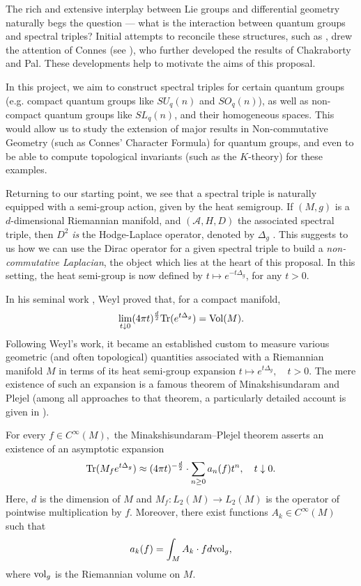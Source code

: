 \documentclass[12pt]{article}
\begin{document}
The rich and extensive interplay between Lie groups and differential geometry
naturally begs the question --- what is the interaction between quantum groups
and spectral triples?
Initial attempts to reconcile these structures, such as
\cite{ChakrabortyPal, NeshTus}, drew the attention of Connes (see
\cite{Connes-suq2}), who further developed the results of Chakraborty and Pal.
These developments help to motivate the aims of this proposal.

In this project, we aim to construct spectral triples for certain quantum groups
(e.g. compact quantum groups like $SU_q(n)$ and $SO_q(n)$),
as well as non-compact quantum groups like $SL_q(n)$, and their homogeneous 
spaces.
This would allow us to study the extension of major results in Non-commutative
Geometry (such as Connes' Character Formula) for quantum groups, and even
to be able to compute topological invariants (such as the $K$-theory) for these
examples.

Returning to our starting point, we see that a spectral triple is naturally
equipped with a semi-group action, given by the heat semigroup.
If $(M,g)$ is a $d$-dimensional Riemannian manifold, and $(\mathcal A,H,D)$ the
associated spectral triple, then $D^2$ \textit{is} the Hodge-Laplace operator,
denoted by $\Delta_g$ \cite{Rosenberg}.
This suggests to us how we can use the Dirac operator for a given spectral triple
to build a \textit{non-commutative Laplacian}, the object which lies at the
heart of this proposal.
In this setting, the heat semi-group is now defined by $t\mapsto e^{-t\Delta_g}$,
for any $t>0$.

In his seminal work \cite{Weyl}, Weyl proved that, for a compact manifold,
\begin{equation}\label{weyl formula}
	\lim_{t\downarrow0}(4\pi t)^{\frac{d}{2}}{\rm Tr}(e^{t\Delta_g})={\rm Vol}(M).
\end{equation}
Following Weyl's work, it became an established custom to measure various geometric (and often topological) quantities associated with a Riemannian manifold $M$ in terms of its heat semi-group expansion $t\mapsto e^{t\Delta_g},\quad t>0.$ The mere existence of such an expansion is a famous theorem of Minakshisundaram and Plejel (among all approaches to that theorem, a particularly detailed account is given in \cite{Rosenberg}). 

For every $f\in C^{\infty}(M),$ the Minakshisundaram--Plejel theorem asserts an existence of an asymptotic expansion 
\begin{equation}\label{heat asymptotic}
{\rm Tr}(M_fe^{t\Delta_g})\approx (4\pi t)^{-\frac{d}{2}}\cdot \sum_{n\geq0}a_n(f)t^n,\quad t\downarrow0.
\end{equation}
Here, $d$ is the dimension of $M$ and $M_f:L_2(M)\to L_2(M)$ is the operator of pointwise multiplication by $f.$ Moreover, there exist functions $A_k\in C^{\infty}(M)$ such that
\begin{equation}\label{normality of coefficients}
a_k(f)=\int_M A_k\cdot f d{\rm vol}_g,
\end{equation}
where ${\rm vol}_g$ is the Riemannian volume on $M.$
\end{document}
